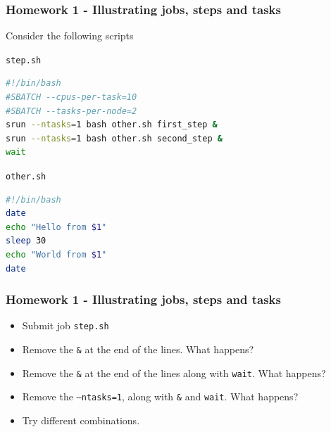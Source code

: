 \documentclass{beamer}
\newcommand{\code}[1]{\colorbox{codegray}{\texttt{#1}}}
\begin{document}
\begin{frame}[fragile]
\frametitle{Homework 1 - Illustrating jobs, steps and tasks}
Consider the following scripts

\medskip
\code{step.sh}
\begingroup
\small
\begin{lstlisting}[backgroundcolor = \color{codegray},showstringspaces=false, language=Bash]
#!/bin/bash
#SBATCH --cpus-per-task=10
#SBATCH --tasks-per-node=2
srun --ntasks=1 bash other.sh first_step &
srun --ntasks=1 bash other.sh second_step &
wait
\end{lstlisting}
\endgroup


\medskip
\code{other.sh}
\begingroup
\small
\begin{lstlisting}[backgroundcolor = \color{codegray},showstringspaces=false, language=Bash]
#!/bin/bash
date
echo "Hello from $1"
sleep 30
echo "World from $1"
date
\end{lstlisting}
\endgroup
\end{frame}



\begin{frame}
\frametitle{Homework 1 - Illustrating jobs, steps and tasks}
\begin{itemize}
    \item Submit job \code{step.sh}
    \bigskip
    \item Remove the \code{\&} at the end of the lines. What happens?
    \bigskip
    \item Remove the \code{\&} at the end of the lines along with \code{wait}. What happens?
    \bigskip
    \item Remove the \code{--ntasks=1}, along with \code{\&} and \code{wait}. What happens?
    \bigskip
    \item Try different combinations.
\end{itemize}
\end{frame}
\end{document}
